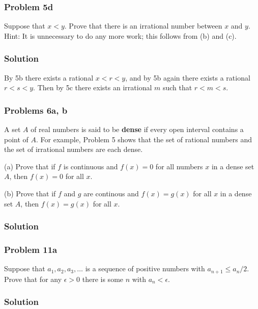 \subsubsection*{Problem 5d}
Suppose that $x<y$. Prove that there is an irrational number between
$x$ and $y$. Hint: It is unnecessary to do any more work; this follows
from (b) and (c).

\subsubsection*{Solution}
By 5b there exists a rational $x<r<y$, and by 5b again there exists a
rational $r<s<y$. Then by 5c there exists an irrational $m$ such that
$r<m<s$.

\subsubsection*{Problems 6a, b}
A set $A$ of real numbers is said to be \textbf{dense} if every open
interval contains a point of $A$. For example, Problem 5 shows that
the set of rational numbers and the set of irrational numbers are each
dense.

\vs

(a) Prove that if $f$ is continuous and $f(x)=0$ for all numbers $x$
in a dense set $A$, then $f(x)=0$ for all $x$.

\vs

(b) Prove that if $f$ and $g$ are continous and $f(x)=g(x)$ for all
$x$ in a dense set $A$, then $f(x)=g(x)$ for all $x$.

\subsubsection*{Solution}

\subsubsection*{Problem 11a}
Suppose that $a_{1}, a_{2}, a_{3}, \ldots$ is a sequence of positive
numbers with $a_{n+1}\leq a_{n}/2$. Prove that for any $\epsilon>0$ there is
some $n$ with $a_{n}<\epsilon$.

\subsubsection*{Solution}



